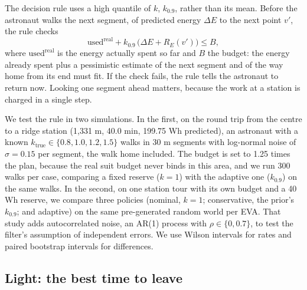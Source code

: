 \documentclass[11pt,a4paper]{article}
\begin{document}
The decision rule uses a high quantile of $k$, $k_{0.9}$, rather than its mean. Before the astronaut walks the next segment, of predicted energy $\Delta E$ to the next point $v'$, the rule checks \[\text{used}^\text{real} + k_{0.9}\,\big(\Delta E + R_E(v')\big) \le B ,\] where $\text{used}^\text{real}$ is the energy actually spent so far and $B$ the budget: the energy already spent plus a pessimistic estimate of the next segment and of the way home from its end must fit. If the check fails, the rule tells the astronaut to return now. Looking one segment ahead matters, because the work at a station is charged in a single step.

We test the rule in two simulations. In the first, on the round trip from the centre to a ridge station (1,331 m, 40.0 min, 199.75 Wh predicted), an astronaut with a known $k_\text{true} \in \{0.8, 1.0, 1.2, 1.5\}$ walks in 30 m segments with log-normal noise of $\sigma = 0.15$ per segment, the walk home included. The budget is set to 1.25 times the plan, because the real suit budget never binds in this area, and we run 300 walks per case, comparing a fixed reserve ($k = 1$) with the adaptive one ($k_{0.9}$) on the same walks. In the second, on one station tour with its own budget and a 40 Wh reserve, we compare three policies (nominal, $k = 1$; conservative, the prior's $k_{0.9}$; and adaptive) on the same pre-generated random world per EVA. That study adds autocorrelated noise, an AR(1) process with $\rho \in \{0, 0.7\}$, to test the filter's assumption of independent errors. We use Wilson intervals for rates and paired bootstrap intervals for differences.

\subsection{Light: the best time to leave}
\end{document}
